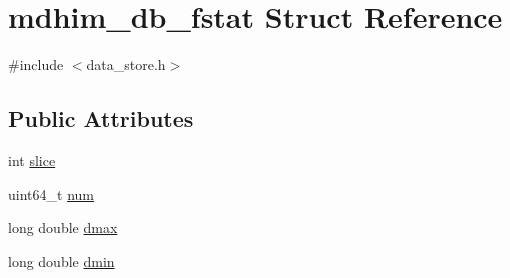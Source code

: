 \hypertarget{structmdhim__db__fstat}{\section{mdhim\-\_\-db\-\_\-fstat Struct Reference}
\label{d6/dca/structmdhim__db__fstat}
}


{\ttfamily \#include $<$data\-\_\-store.\-h$>$}

\subsection*{Public Attributes}
\begin{DoxyCompactItemize}
\item 
int \hyperlink{structmdhim__db__fstat_a058b21688809dbc426bf464f967c5bf3}{slice}
\item 
uint64\-\_\-t \hyperlink{structmdhim__db__fstat_a4ce8dc02a9a126e5079a50ba3509a49b}{num}
\item 
long double \hyperlink{structmdhim__db__fstat_a6a955791d2278a8f27816149f294b930}{dmax}
\item 
long double \hyperlink{structmdhim__db__fstat_a945705f2eeeb829955e11d21a9377b0f}{dmin}
\end{DoxyCompactItemize}


